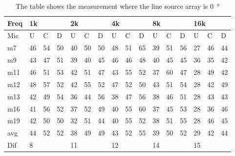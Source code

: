 \begin{table}[H]
\centering
\caption{The table shows the measurement where the line source array is \SI{0}{\degree}}
\begin{tabular}{l|l|l|l|l|l|l|l|l|l|l|l|l|lll}
Freq & \multicolumn{3}{l|}{1k} & \multicolumn{3}{l|}{2k} & \multicolumn{3}{l|}{4k} & \multicolumn{3}{l|}{8k} & \multicolumn{3}{l}{16k}                                \\ \hline
Mic  & U      & C      & D     & U      & C      & D     & U      & C      & D     & U      & C      & D     & \multicolumn{1}{l|}{U}  & \multicolumn{1}{l|}{C}  & D  \\ \hline
m7   & 46     & 54     & 50    & 40     & 50     & 50    & 48     & 51     & 65    & 39     & 51     & 56    & \multicolumn{1}{l|}{27} & \multicolumn{1}{l|}{46} & 44 \\
m9   & 43     & 47     & 51    & 39     & 40     & 45    & 46     & 46     & 48    & 40     & 45     & 45    & \multicolumn{1}{l|}{36} & \multicolumn{1}{l|}{35} & 42 \\
m11  & 46     & 51     & 53    & 42     & 51     & 47    & 43     & 55     & 52    & 37     & 60     & 47    & \multicolumn{1}{l|}{28} & \multicolumn{1}{l|}{49} & 42 \\
m12  & 48     & 57     & 52    & 42     & 55     & 52    & 47     & 52     & 50    & 43     & 51     & 54    & \multicolumn{1}{l|}{28} & \multicolumn{1}{l|}{42} & 49 \\
m13  & 42     & 49     & 54    & 36     & 44     & 56    & 38     & 47     & 56    & 38     & 46     & 51    & \multicolumn{1}{l|}{28} & \multicolumn{1}{l|}{43} & 43 \\
m16  & 41     & 56     & 52    & 37     & 52     & 49    & 40     & 55     & 60    & 37     & 45     & 53    & \multicolumn{1}{l|}{28} & \multicolumn{1}{l|}{36} & 46 \\
m19  & 42     & 50     & 50    & 32     & 51     & 44    & 40     & 55     & 52    & 38     & 51     & 55    & \multicolumn{1}{l|}{28} & \multicolumn{1}{l|}{46} & 45 \\ \hline
avg  &  44    &  52    & 52    &  38     &  49    &  49   & 43     & 52     & 55    & 39     & 50     & 52    & \multicolumn{1}{l|}{29}   & \multicolumn{1}{l|}{42}   & 44 \\ \hline  
Dif & \multicolumn{3}{l|}{8} & \multicolumn{3}{l|}{11} & \multicolumn{3}{l|}{12} & \multicolumn{3}{l|}{14} & \multicolumn{3}{l}{15}                                
\end{tabular}
\end{table}


